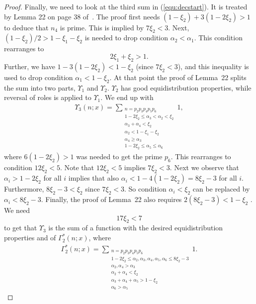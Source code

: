 \documentclass{amsart}
\numberwithin{equation}{section}
\begin{document}
\begin{proof}
Finally, we need to look at the third sum in (\ref{equ:decstart}). It  is treated by Lemma 22 on page 38 of~\cite{Stadlmann:2023:PAP}.  The proof first needs $(1-\xi_2) + 3(1-2\xi_2) >1$  to deduce that $n_4$ is prime. This is implied by $7\xi_2 <3$. Next, $(1-\xi_2)/2> 1-\xi_1-\xi_2$ is needed to drop condition $\alpha_2 <\alpha_1$. This condition rearranges to 
$$   2\xi_1+ \xi_2  > 1. $$
Further, we have $1-3(1-2\xi_2) < 1-\xi_2$ (since $  7\xi_2  <  3$), and this inequality  is used to drop condition $\alpha_1 < 1-\xi_2$.  At that point the proof of Lemma~22  splits the sum into two parts, $\Upsilon_1$ and $\Upsilon_2$. $\Upsilon_2$ has good equidistribution properties, while reversal of roles is applied to $\Upsilon_1$. We end up with 
 \begin{align*}
\Upsilon_3(n;x) = \sum_{\substack{ n = p_2p_3p_4p_5p_6 \\ 1-2\xi_2 \leq \alpha_3 <\alpha_2 < \xi_2 \\ \alpha_3+\alpha_4 < \xi_2 \\ \alpha_2 < 1-\xi_1-\xi_2 \\ \alpha_4 \geq \alpha_3 \\ 1-2\xi_2 \leq \alpha_5 \leq \alpha_6}} 1, 
\end{align*} 
where $6(1-2\xi_2)>1$  was needed to get the prime $p_6$. This rearranges to condition
$
12\xi_2<5.
$
Note that $
12\xi_2<5 
$ implies $
7\xi_2<3.
$
Next we observe that $\alpha_i > 1-2\xi_2$ for all $i$ implies that also $\alpha_i < 1-4(1-2\xi_2)= 8\xi_2-3   $ for all $i$. Furthermore, $8\xi_2-3 < \xi_2$ since $7\xi_2 <3$. So condition $\alpha_i < \xi_2$ can be replaced by $\alpha_i < 8\xi_2-3  $.  Finally, the proof of Lemma~22  also requires $2( 8\xi_2-3) < 1- \xi_2$ . We need
  $$17\xi_2  < 7 $$
  to get that $\Upsilon_3$ is the sum of a function with the desired equidistribution properties and of $\Gamma^*_2(n;x)$, where
  \begin{align}\label{equ:decpart2}
\Gamma^*_2(n;x)=\sum_{\substack{ n = p_2p_3p_4p_5p_6 \\1-2\xi_2 \leq \alpha_2, \alpha_3, \alpha_4, \alpha_5, \alpha_6 \leq 8\xi_2-3   \\ \alpha_2, \alpha_4 > \alpha_3  \\ \alpha_2+\alpha_4 <\xi_2\\ \alpha_3 + \alpha_4 + \alpha_5 >1- \xi_2 \\   \alpha_6 > \alpha_5 }} 1.
\end{align}
   

\end{proof}
\end{document}
